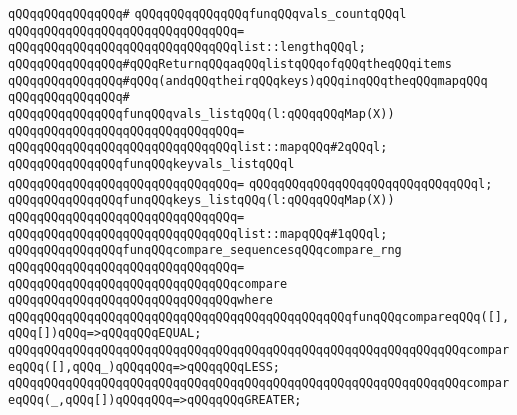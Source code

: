 \verb|qQQqqQQqqQQqqQQq#|\newline
\verb|qQQqqQQqqQQqqQQqfunqQQqvals_countqQQql|\newline
\verb|qQQqqQQqqQQqqQQqqQQqqQQqqQQqqQQq=|\newline
\verb|qQQqqQQqqQQqqQQqqQQqqQQqqQQqqQQqlist::lengthqQQql;|\newline
\newline
\newline
\verb|qQQqqQQqqQQqqQQq#qQQqReturnqQQqaqQQqlistqQQqofqQQqtheqQQqitems|\newline
\verb|qQQqqQQqqQQqqQQq#qQQq(andqQQqtheirqQQqkeys)qQQqinqQQqtheqQQqmapqQQq|\newline
\verb|qQQqqQQqqQQqqQQq#|\newline
\verb|qQQqqQQqqQQqqQQqfunqQQqvals_listqQQq(l:qQQqqQQqMap(X))|\newline
\verb|qQQqqQQqqQQqqQQqqQQqqQQqqQQqqQQq=|\newline
\verb|qQQqqQQqqQQqqQQqqQQqqQQqqQQqqQQqlist::mapqQQq#2qQQql;|\newline
\newline
\verb|qQQqqQQqqQQqqQQqfunqQQqkeyvals_listqQQql|\newline
\verb|qQQqqQQqqQQqqQQqqQQqqQQqqQQqqQQq=|\newline
\verb|qQQqqQQqqQQqqQQqqQQqqQQqqQQqqQQql;|\newline
\newline
\verb|qQQqqQQqqQQqqQQqfunqQQqkeys_listqQQq(l:qQQqqQQqMap(X))|\newline
\verb|qQQqqQQqqQQqqQQqqQQqqQQqqQQqqQQq=|\newline
\verb|qQQqqQQqqQQqqQQqqQQqqQQqqQQqqQQqlist::mapqQQq#1qQQql;|\newline
\newline
\verb|qQQqqQQqqQQqqQQqfunqQQqcompare_sequencesqQQqcompare_rng|\newline
\verb|qQQqqQQqqQQqqQQqqQQqqQQqqQQqqQQq=|\newline
\verb|qQQqqQQqqQQqqQQqqQQqqQQqqQQqqQQqcompare|\newline
\verb|qQQqqQQqqQQqqQQqqQQqqQQqqQQqqQQqwhere|\newline
\verb|qQQqqQQqqQQqqQQqqQQqqQQqqQQqqQQqqQQqqQQqqQQqqQQqfunqQQqcompareqQQq([],qQQq[])qQQq=>qQQqqQQqEQUAL;|\newline
\verb|qQQqqQQqqQQqqQQqqQQqqQQqqQQqqQQqqQQqqQQqqQQqqQQqqQQqqQQqqQQqqQQqcompareqQQq([],qQQq_)qQQqqQQq=>qQQqqQQqLESS;|\newline
\verb|qQQqqQQqqQQqqQQqqQQqqQQqqQQqqQQqqQQqqQQqqQQqqQQqqQQqqQQqqQQqqQQqcompareqQQq(_,qQQq[])qQQqqQQq=>qQQqqQQqGREATER;|\newline
